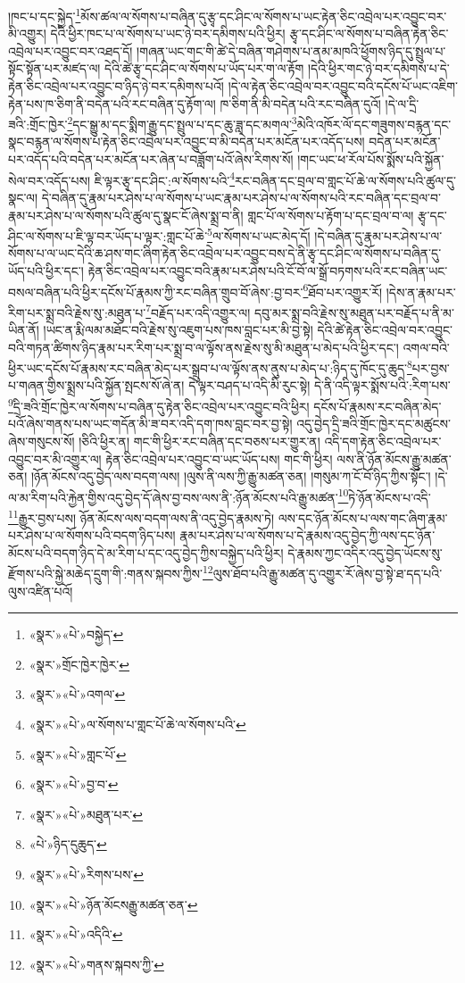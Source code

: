 །ཁང་པ་དང་སྐྱེད་\footnote{«སྣར་»«པེ་»བསྐྱེད་}མོས་ཚལ་ལ་སོགས་པ་བཞིན་དུ་རྩྭ་དང་ཤིང་ལ་སོགས་པ་ཡང་རྟེན་ཅིང་འབྲེལ་པར་འབྱུང་བར་མི་འགྱུར། དེའི་ཕྱིར་ཁང་པ་ལ་སོགས་པ་ཡང་ཉེ་བར་དམིགས་པའི་ཕྱིར། རྩྭ་དང་ཤིང་ལ་སོགས་པ་བཞིན་རྟེན་ཅིང་འབྲེལ་པར་འབྱུང་བར་འཐད་དོ། །གཞན་ཡང་གང་གི་ཚེ་དེ་བཞིན་གཤེགས་པ་ནམ་མཁའི་ཕྱོགས་ཉིད་དུ་སྤྲུལ་པ་སྟོང་སྟོན་པར་མཛད་ལ། དེའི་ཚེ་རྩྭ་དང་ཤིང་ལ་སོགས་པ་ཡོད་པར་ག་ལ་རྟོག །དེའི་ཕྱིར་གང་ཉེ་བར་དམིགས་པ་དེ་རྟེན་ཅིང་འབྲེལ་པར་འབྱུང་བ་ཉིད་ཉེ་བར་དམིགས་པའོ། །དེ་ལ་རྟེན་ཅིང་འབྲེལ་བར་འབྱུང་བའི་དངོས་པོ་ཡང་འཇིག་རྟེན་པས་ཁ་ཅིག་ནི་བདེན་པའི་རང་བཞིན་དུ་རྟོག་ལ། ཁ་ཅིག་ནི་མི་བདེན་པའི་རང་བཞིན་དུའོ། །དེ་ལ་དྲི་ཟའི་:གྲོང་ཁྱེར་\footnote{«སྣར་»གྲོང་ཁྱེར་ཁྱེར་}དང་སྒྱུ་མ་དང་སྨིག་རྒྱུ་དང་སྤྲུལ་པ་དང་ཆུ་ཟླ་དང་མགལ་\footnote{«སྣར་»«པེ་»འགལ་}མེའི་འཁོར་ལོ་དང་གཟུགས་བརྙན་དང་སྣང་བརྙན་ལ་སོགས་པ་རྟེན་ཅིང་འབྲེལ་པར་འབྱུང་བ་མི་བདེན་པར་མངོན་པར་འདོད་པས། བདེན་པར་མངོན་པར་འདོད་པའི་བདེན་པར་མངོན་པར་ཞེན་པ་བཟློག་པའོ་ཞེས་རིགས་སོ། །གང་ཡང་ཕ་རོལ་པོས་སྨོས་པའི་སྐྱོན་སེལ་བར་འདོད་པས། ཇི་ལྟར་རྩྭ་དང་ཤིང་:ལ་སོགས་པའི་\footnote{«སྣར་»«པེ་»ལ་སོགས་པ་གླང་པོ་ཆེ་ལ་སོགས་པའི་}རང་བཞིན་དང་བྲལ་བ་གླང་པོ་ཆེ་ལ་སོགས་པའི་ཚུལ་དུ་སྣང་ལ། དེ་བཞིན་དུ་རྣམ་པར་ཤེས་པ་ལ་སོགས་པ་ཡང་རྣམ་པར་ཤེས་པ་ལ་སོགས་པའི་རང་བཞིན་དང་བྲལ་བ་རྣམ་པར་ཤེས་པ་ལ་སོགས་པའི་ཚུལ་དུ་སྣང་ངོ་ཞེས་སྨྲ་བ་ནི། གླང་པོ་ལ་སོགས་པ་རྟོག་པ་དང་བྲལ་བ་ལ། རྩྭ་དང་ཤིང་ལ་སོགས་པ་ཇི་ལྟ་བར་ཡོད་པ་ལྟར་:གླང་པོ་ཆེ་\footnote{«སྣར་»«པེ་»གླང་པོ་}ལ་སོགས་པ་ཡང་མེད་དོ། །དེ་བཞིན་དུ་རྣམ་པར་ཤེས་པ་ལ་སོགས་པ་ལ་ཡང་དེའི་ཆ་ཤས་གང་ཞིག་རྟེན་ཅིང་འབྲེལ་པར་འབྱུང་བས་དེ་ནི་རྩྭ་དང་ཤིང་ལ་སོགས་པ་བཞིན་དུ་ཡོད་པའི་ཕྱིར་དང་། རྟེན་ཅིང་འབྲེལ་པར་འབྱུང་བའི་རྣམ་པར་ཤེས་པའི་ངོ་བོ་ལ་སྒྲོ་བཏགས་པའི་རང་བཞིན་ཡང་བསལ་བཞིན་པའི་ཕྱིར་དངོས་པོ་རྣམས་ཀྱི་རང་བཞིན་གྲུབ་བོ་ཞེས་:བྱ་བར་\footnote{«སྣར་»«པེ་»བྱ་བ་}ཐོབ་པར་འགྱུར་རོ། །དེས་ན་རྣམ་པར་རིག་པར་སྨྲ་བའི་རྗེས་སུ་:མཐུན་པ་\footnote{«སྣར་»«པེ་»མཐུན་པར་}བརྗོད་པར་འདི་འགྱུར་ལ། དབུ་མར་སྨྲ་བའི་རྗེས་སུ་མཐུན་པར་བརྗོད་པ་ནི་མ་ཡིན་ནོ། །ཡང་ན་རྨི་ལམ་མཐོང་བའི་རྗེས་སུ་འཇུག་པས་ཁས་བླང་པར་མི་བྱ་སྟེ། དེའི་ཚེ་རྟེན་ཅིང་འབྲེལ་བར་འབྱུང་བའི་གཏན་ཚིགས་ཉིད་རྣམ་པར་རིག་པར་སྨྲ་བ་ལ་ལྟོས་ནས་རྗེས་སུ་མི་མཐུན་པ་མེད་པའི་ཕྱིར་དང་། འགལ་བའི་ཕྱིར་ཡང་དངོས་པོ་རྣམས་རང་བཞིན་མེད་པར་སྒྲུབ་པ་ལ་ལྟོས་ནས་ནུས་པ་མེད་པ་:ཉིད་དུ་ཁོང་དུ་ཆུད་\footnote{«པེ་»ཉིད་དུཆུད་}པར་བྱས་པ་གཞན་གྱིས་སྨྲས་པའི་སྐྱོན་སྤངས་སོ་ཞེ་ན། དེ་ལྟར་བཤད་པ་འདི་མི་རུང་སྟེ། དེ་ནི་འདི་ལྟར་སྨོས་པའི་:རིག་པས་\footnote{«སྣར་»«པེ་»རིགས་པས་}དྲི་ཟའི་གྲོང་ཁྱེར་ལ་སོགས་པ་བཞིན་དུ་རྟེན་ཅིང་འབྲེལ་པར་འབྱུང་བའི་ཕྱིར། དངོས་པོ་རྣམས་རང་བཞིན་མེད་པའོ་ཞེས་གནས་པས་ཡང་གདོན་མི་ཟ་བར་འདི་དག་ཁས་བླང་བར་བྱ་སྟེ། འདུ་བྱེད་དྲི་ཟའི་གྲོང་ཁྱེར་དང་མཚུངས་ཞེས་གསུངས་སོ། །ཅིའི་ཕྱིར་ན། གང་གི་ཕྱིར་རང་བཞིན་དང་བཅས་པར་གྱུར་ན། འདི་དག་རྟེན་ཅིང་འབྲེལ་པར་འབྱུང་བར་མི་འགྱུར་ལ། རྟེན་ཅིང་འབྲེལ་པར་འབྱུང་བ་ཡང་ཡོད་པས། གང་གི་ཕྱིར། ལས་ནི་ཉོན་མོངས་རྒྱུ་མཚན་ཅན། །ཉོན་མོངས་འདུ་བྱེད་ལས་བདག་ལས། །ལུས་ནི་ལས་ཀྱི་རྒྱུ་མཚན་ཅན། །གསུམ་ཀ་ངོ་བོ་ཉིད་ཀྱིས་སྟོང་། །དེ་ལ་མ་རིག་པའི་རྐྱེན་གྱིས་འདུ་བྱེད་དོ་ཞེས་བྱ་བས་ལས་ནི་:ཉོན་མོངས་པའི་རྒྱུ་མཚན་\footnote{«སྣར་»«པེ་»ཉོན་མོངསརྒྱུ་མཚན་ཅན་}ཏེ་ཉོན་མོངས་པ་འདི་\footnote{«སྣར་»«པེ་»འདིའི་}རྒྱུར་བྱས་པས། ཉོན་མོངས་ལས་བདག་ལས་ནི་འདུ་བྱེད་རྣམས་ཏེ། ལས་དང་ཉོན་མོངས་པ་ལས་གང་ཞིག་རྣམ་པར་ཤེས་པ་ལ་སོགས་པའི་བདག་ཉིད་པས། རྣམ་པར་ཤེས་པ་ལ་སོགས་པ་དེ་རྣམས་འདུ་བྱེད་ཀྱི་ལས་དང་ཉོན་མོངས་པའི་བདག་ཉིད་དེ་མ་རིག་པ་དང་འདུ་བྱེད་ཀྱིས་བསྐྱེད་པའི་ཕྱིར། དེ་རྣམས་ཀྱང་འདིར་འདུ་བྱེད་ཡོངས་སུ་རྫོགས་པའི་སྐྱེ་མཆེད་དྲུག་གི་:གནས་སྐབས་ཀྱིས་\footnote{«སྣར་»«པེ་»གནས་སྐབས་ཀྱི་}ལུས་ཐོབ་པའི་རྒྱུ་མཚན་དུ་འགྱུར་རོ་ཞེས་བྱ་སྟེ་ཐ་དད་པའི་ལུས་འཛིན་པའོ། 